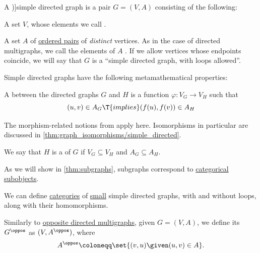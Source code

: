 \begin{definition}\label{def:directed_graph}
  A \term[ru=ориентированный граф (\cite[16]{ЕмеличевИПр1990ТеорияГрафов})]{simple directed graph} is a pair \( G = (V, A) \) consisting of the following:
  \begin{thmenum}[series=def:directed_graph]
     A set \( V \), whose elements we call .

     A set \( A \) of \hyperref[def:ordered_tuple]{ordered pairs} of \emph{distinct} vertices. As in the case of directed multigraphs, we call the elements of \( A \) . If we allow vertices whose endpoints coincide, we will say that \( G \) is a \enquote{simple directed graph, with loops allowed}.
  \end{thmenum}

  Simple directed graphs have the following metamathematical properties:
  \begin{thmenum}[resume=def:directed_graph]
    \mimprovised A  between the directed graphs \( G \) and \( H \) is a function \( \varphi: V_G \to V_H \) such that
    \begin{equation*}
      (u, v) \in A_G \T{implies} (f(u), f(v)) \in A_H
    \end{equation*}

    The morphism-related notions from  apply here. Isomorphisms in particular are discussed in \cref{thm:graph_isomorphisms/simple_directed}.

    \mimprovised We say that \( H \) is a  of \( G \) if \( V_G \subseteq V_H \) and \( A_G \subseteq A_H \).

    As we will show in \cref{thm:subgraphs}, subgraphs correspond to \hyperref[def:categorical_subobject]{categorical subobjects}.

    \mimprovised We can define \hyperref[def:category]{categories} of \hyperref[def:small_set]{small} simple directed graphs, with and without loops, along with their homomorphisms.

    \mimprovised Similarly to \hyperref[def:directed_multigraph/opposite_arcs]{opposite directed multigraphs}, given \( G = (V, A) \), we define its  \( G^\oppos \) as \( (V, A^\oppos) \), where
    \begin{equation*}
      A^\oppos \coloneqq \set{ (v, u) \given (u, v) \in A }.
    \end{equation*}
  \end{thmenum}
\end{definition}
